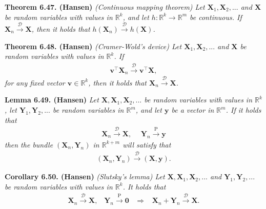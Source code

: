 \documentclass[a4paper,10pt,openany]{book}
\begin{document}
\textbf{Theorem 6.47. (Hansen)} \emph{(Continuous mapping theorem) Let \(\mathbf{X}_1,\mathbf{X}_2,...\) and \(\mathbf{X}\) be random variables with values in \(\mathbb{R}^k\), and let \(h : \mathbb{R}^k\to\mathbb{R}^m\) be continuous. If \(\mathbf{X}_n\stackrel{\mathcal{D}}{\to} \mathbf{X}\), then it holds that \(h(\mathbf{X}_n)\stackrel{\mathcal{D}}{\to} h(\mathbf{X})\).}

\textbf{Theorem 6.48. (Hansen)} \emph{(Cramer-Wold's device) Let \(\mathbf{X}_1,\mathbf{X}_2,...\) and \(\mathbf{X}\) be random variables with values in \(\mathbb{R}^k\). If}
\begin{align*}
    \mathbf{v}^\top\mathbf{X}_n\stackrel{\mathcal{D}}{\to} \mathbf{v}^\top\mathbf{X},\tag{6.51}
\end{align*}
\emph{for any fixed vector \(\mathbf{v}\in\mathbb{R}^k\), then it holds that \(\mathbf{X}_n\stackrel{\mathcal{D}}{\to} \mathbf{X}\).}

\textbf{Lemma 6.49. (Hansen)} \emph{Let \(\mathbf{X},\mathbf{X}_1,\mathbf{X}_2,...\) be random variables with values in \(\mathbb{R}^k\), let \(\mathbf{Y}_1,\mathbf{Y}_2,...\) be random variables in \(\mathbb{R}^m\), and let \(\mathbf{y}\) be a vector in \(\mathbb{R}^m\). If it holds that}
\begin{align*}
    \mathbf{X}_n\stackrel{\mathcal{D}}{\to} \mathbf{X},\hspace{15pt}\mathbf{Y}_n\stackrel{\text{P}}{\to} \mathbf{y}
\end{align*}
\emph{then the bundle \((\mathbf{X}_n,\mathbf{Y}_n)\) in \(\mathbb{R}^{k+m}\) will satisfy that}
\begin{align*}
    (\mathbf{X}_n,\mathbf{Y}_n)\stackrel{\mathcal{D}}{\to} (\mathbf{X},\mathbf{y}).
\end{align*}

\textbf{Corollary 6.50. (Hansen)} \emph{(Slutsky's lemma) Let \(\mathbf{X},\mathbf{X}_1,\mathbf{X}_2,...\) and \(\mathbf{Y}_1,\mathbf{Y}_2,...\) be random variables with values in \(\mathbb{R}^k\). It holds that}
\begin{align*}
    \mathbf{X}_n\stackrel{\mathcal{D}}{\to} \mathbf{X},\hspace{10pt}\mathbf{Y}_n\stackrel{\text{P}}{\to} \mathbf{0}\hspace{10pt}\Rightarrow\hspace{10pt} \mathbf{X}_n+\mathbf{Y}_n\stackrel{\mathcal{D}}{\to}\mathbf{X}.
\end{align*}
\end{document}
